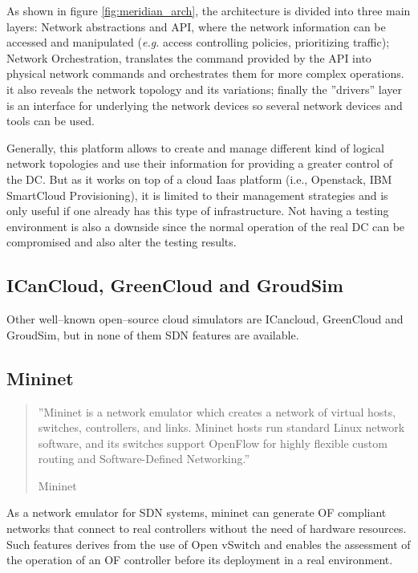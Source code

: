 \documentclass[12pt,english,oneside]{book}
\begin{document}
As shown in figure \ref{fig:meridian_arch}, the architecture is divided into three main layers: Network abstractions and API, where the network information can be accessed and manipulated (\textit{e.g.} access controlling policies, prioritizing traffic); Network Orchestration, translates the command provided by the API into physical network commands and orchestrates them for more complex operations. it also reveals the network topology and its variations; finally the ''drivers'' layer is an interface for underlying the network devices so several network devices and tools can be used.

Generally, this platform allows to create and manage different kind of logical network topologies and use their information for providing a greater control of the DC.
But as it works on top of a cloud Iaas platform (i.e., Openstack\cite{openstack}, IBM SmartCloud Provisioning\cite{scp}), it is limited to their management strategies and is only useful if one already has this type of infrastructure. Not having a testing environment is also a downside since the normal operation of the real DC can be compromised and also alter the testing results.

\subsection{ICanCloud, GreenCloud and GroudSim}
\hspace{0.6cm}

Other well--known open--source cloud simulators are ICancloud\cite{icancloud}, GreenCloud\cite{greencloud} and GroudSim\cite{groudsim}, but in none of them SDN features are available.

\newpage
\subsection{Mininet}
\hspace{0.6cm}
\begin{quotation}

''Mininet is a network emulator which creates a network of virtual hosts, switches, controllers, and links. Mininet hosts run standard Linux network software, and its switches support OpenFlow for highly flexible custom routing and Software-Defined Networking.''

\hfill Mininet \cite{mininet}
\end{quotation}

As a network emulator for SDN systems, mininet can generate OF compliant networks that connect to real controllers without the need of hardware resources. Such features derives from the use of Open vSwitch and enables the assessment of the operation of an OF controller before its deployment in a real environment.
\end{document}
